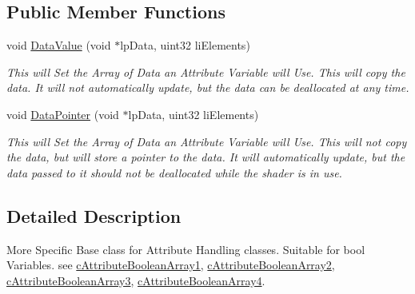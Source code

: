 \subsection*{Public Member Functions}
\begin{DoxyCompactItemize}
\item 
\hypertarget{classc_boolean_attribute_store_af1ea16395c02827582c8aac43a713fa1}{
void \hyperlink{classc_boolean_attribute_store_af1ea16395c02827582c8aac43a713fa1}{DataValue} (void $\ast$lpData, uint32 liElements)}
\label{classc_boolean_attribute_store_af1ea16395c02827582c8aac43a713fa1}

\begin{DoxyCompactList}\small\item\em This will Set the Array of Data an Attribute Variable will Use. This will copy the data. It will not automatically update, but the data can be deallocated at any time. \end{DoxyCompactList}\item 
\hypertarget{classc_boolean_attribute_store_a17ae26d7f4a3d7edfeb9748d20296e13}{
void \hyperlink{classc_boolean_attribute_store_a17ae26d7f4a3d7edfeb9748d20296e13}{DataPointer} (void $\ast$lpData, uint32 liElements)}
\label{classc_boolean_attribute_store_a17ae26d7f4a3d7edfeb9748d20296e13}

\begin{DoxyCompactList}\small\item\em This will Set the Array of Data an Attribute Variable will Use. This will not copy the data, but will store a pointer to the data. It will automatically update, but the data passed to it should not be deallocated while the shader is in use. \end{DoxyCompactList}\end{DoxyCompactItemize}


\subsection{Detailed Description}
More Specific Base class for Attribute Handling classes. Suitable for bool Variables. see \hyperlink{classc_attribute_boolean_array1}{cAttributeBooleanArray1}, \hyperlink{classc_attribute_boolean_array2}{cAttributeBooleanArray2}, \hyperlink{classc_attribute_boolean_array3}{cAttributeBooleanArray3}, \hyperlink{classc_attribute_boolean_array4}{cAttributeBooleanArray4}. 